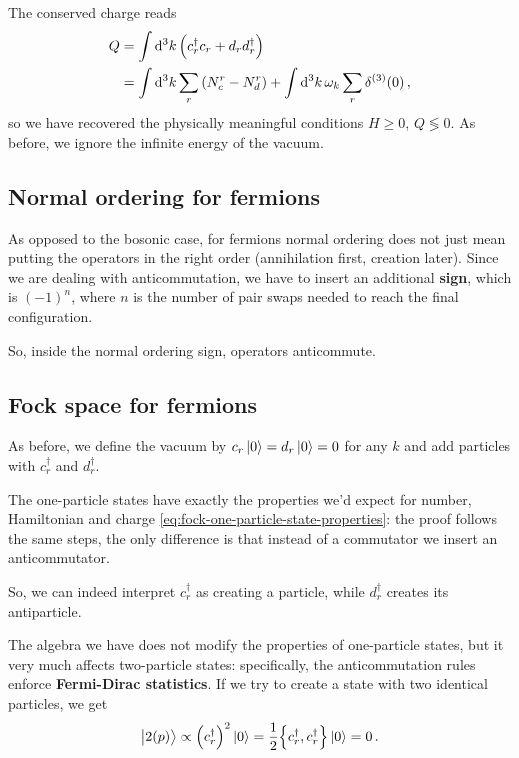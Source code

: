 \documentclass[main.tex]{subfiles}
\begin{document}
The conserved charge reads 
%
\begin{align}
Q &= \int \dd[3]{k}  \qty(c_r ^\dag c_r + d_r d_r ^\dag)  \\
&= \int \dd[3]{k}  \sum _{r} \qty(N_c^{r} - N_d^{r}) + \int \dd[3]{k} \omega_{k} \sum_{r} \delta^{(3)} (0) 
\,,
\end{align}
%
so we have recovered the physically meaningful conditions \(H \geq 0\), \(Q \lessgtr 0\). 
As before, we ignore the infinite energy of the vacuum. 

\subsection{Normal ordering for fermions}

As opposed to the bosonic case, for fermions normal ordering does not just mean putting the operators in the right order (annihilation first, creation later). Since we are dealing with anticommutation, we have to insert an additional \textbf{sign}, which is \((-1)^{n}\), where \(n\) is the number of pair swaps needed to reach the final configuration. 

So, inside the normal ordering sign, operators anticommute.

\subsection{Fock space for fermions}

As before, we define the vacuum by \(c_r \ket{0} = d_r \ket{0} = 0\) for any \(k\) and add particles with \(c_r ^\dag\) and \(d_r ^\dag\).

The one-particle states have exactly the properties we'd expect for number, Hamiltonian and charge \eqref{eq:fock-one-particle-state-properties}: the proof follows the same steps, the only difference is that instead of a commutator we insert an anticommutator. 

So, we can indeed interpret \(c_r ^\dag\) as creating a particle, while \(d_r ^\dag\) creates its antiparticle. 

The algebra we have does not modify the properties of one-particle states, but it very much affects two-particle states: specifically, the anticommutation rules enforce \textbf{Fermi-Dirac statistics}. If we try to create a state with two identical particles, we get 
%
\begin{align}
\ket{2(p)} \propto \qty(c_r ^\dag)^2 \ket{0} = \frac{1}{2} \qty{c_r ^\dag, c_r ^\dag} \ket{0} = 0
\,.
\end{align}
\end{document}
